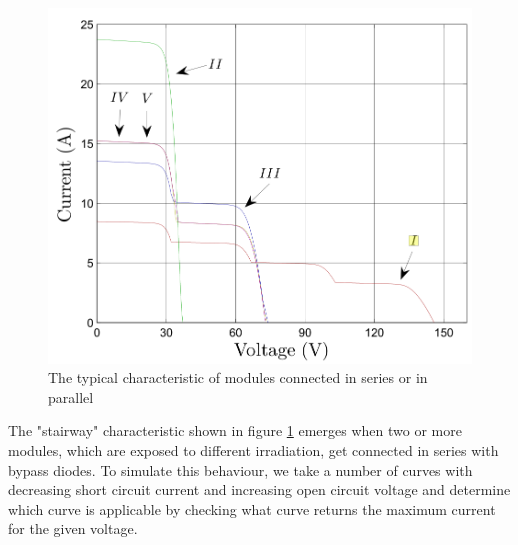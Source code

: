\begin{figure}[h]
	\center
    \includegraphics[width=.5\textwidth]{images/model/steps.png}
    \caption{The typical characteristic of modules connected in series or in parallel}
    \label{fig:model:steps}
\end{figure}
The "stairway"  characteristic shown  in  figure \ref{fig:model:steps}
emerges  when  two or more modules, which are exposed to different  irradiation,
get connected in series with bypass diodes. To simulate this behaviour,  we take
a  number of curves with decreasing short circuit current  and  increasing  open
circuit  voltage  and determine which curve is applicable by checking what curve
returns the maximum current for the given voltage.

